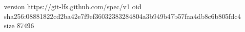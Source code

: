version https://git-lfs.github.com/spec/v1
oid sha256:08881822cd2ba42e7f9ef36032383284804a3b949b47b57faa4db8c6b805fdc4
size 87496
